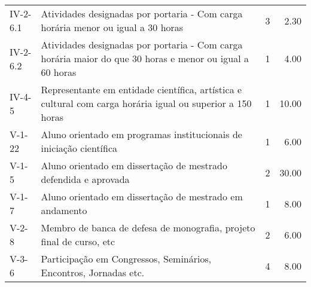 \documentclass[11pt,a4paper]{article}
\begin{document}
\begin{table}[ht]
\begin{tabular}{|l|p{12cm}|r|r|}
  IV-2-6.1 & Atividades designadas por portaria - Com carga horária menor ou igual a 30 horas &   3 & 2.30 \\ 
  IV-2-6.2 & Atividades designadas por portaria - Com carga horária maior do que 30 horas e menor ou igual a 60 horas &   1 & 4.00 \\ 
  IV-4-5 & Representante em entidade científica, artística e cultural com carga horária igual ou superior a 150 horas &   1 & 10.00 \\ 
  V-1-22 & Aluno orientado em programas institucionais de iniciação científica &   1 & 6.00 \\ 
  V-1-5 & Aluno orientado em dissertação de mestrado defendida e aprovada &   2 & 30.00 \\ 
  V-1-7 & Aluno orientado em dissertação de mestrado em andamento &   1 & 8.00 \\ 
  V-2-8 & Membro de banca de defesa de monografia, projeto final de curso, etc &   2 & 6.00 \\ 
  V-3-6 & Participação em Congressos, Seminários, Encontros, Jornadas etc. &   4 & 8.00 \\ 
   \hline
\end{tabular}
\end{table}


\newpage
\end{document}
